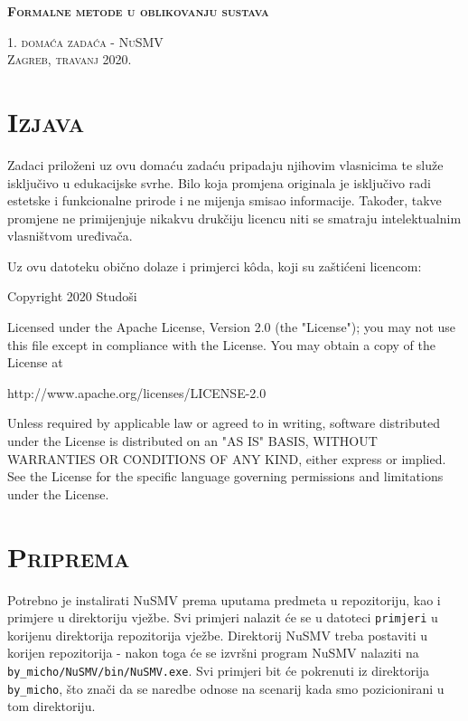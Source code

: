 \documentclass{article}
\newcommand{\crnotice}[1]
{
    \begin{center}
        \colorbox{red!15}{\parbox{\textwidth}{#1}}
    \end{center}
}
\newcommand{\sekcija}[1]{\section{\textsc{#1}}}
\newcommand{\code}[1]{\colorbox{blue!11}{\texttt{#1}}}
\begin{document}
\begin{titlepage}
    \centering
    \vspace*{\fill}

    \huge
    \textbf{\textsc{Formalne metode u oblikovanju sustava}} \\
    
    \vspace*{0.5cm}
    
    \large
    \textsc{1. domaća zadaća - NuSMV} \\

    \vspace*{\fill}
    \textsc{Zagreb, travanj 2020.}
\end{titlepage}

\tableofcontents
\pagebreak



\sekcija{Izjava}

Zadaci priloženi uz ovu domaću zadaću pripadaju njihovim vlasnicima te služe isključivo u edukacijske svrhe. Bilo koja promjena originala je isključivo radi estetske i funkcionalne prirode i ne mijenja smisao informacije. Također, takve promjene ne primijenjuje nikakvu drukčiju licencu niti se smatraju intelektualnim vlasništvom uređivača.
\newline

Uz ovu datoteku obično dolaze i primjerci kôda, koji su zaštićeni licencom:

\crnotice
{
    Copyright 2020 Studoši
    \newline

    Licensed under the Apache License, Version 2.0 (the "License");
    you may not use this file except in compliance with the License.
    You may obtain a copy of the License at
    \newline

        \quad
        http://www.apache.org/licenses/LICENSE-2.0
        \newline

    Unless required by applicable law or agreed to in writing, software
    distributed under the License is distributed on an "AS IS" BASIS,
    WITHOUT WARRANTIES OR CONDITIONS OF ANY KIND, either express or implied.
    See the License for the specific language governing permissions and
    limitations under the License.
}

\sekcija{Priprema}

Potrebno je instalirati NuSMV prema uputama predmeta u repozitoriju, kao i primjere u direktoriju vježbe. Svi primjeri nalazit će se u datoteci \code{primjeri} u korijenu direktorija repozitorija vježbe. Direktorij NuSMV treba postaviti u korijen repozitorija - nakon toga će se izvršni program NuSMV nalaziti na \code{by\_micho/NuSMV/bin/NuSMV.exe}. Svi primjeri bit će pokrenuti iz direktorija \code{by\_micho}, što znači da se naredbe odnose na scenarij kada smo pozicionirani u tom direktoriju.
\end{document}
